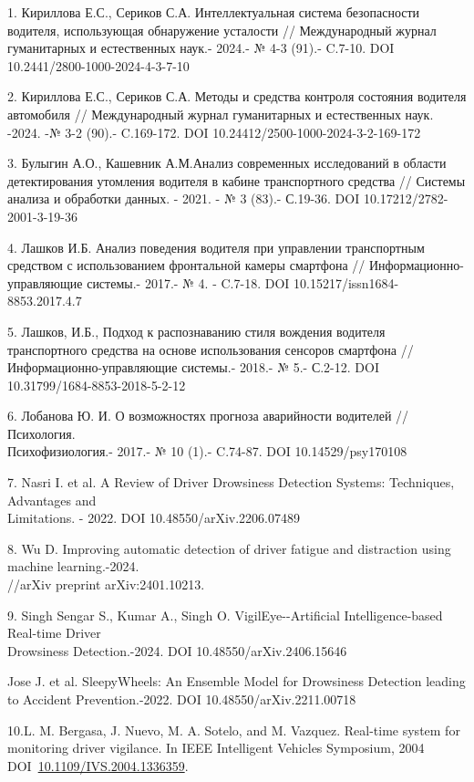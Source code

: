 \begin{references}
1. Кириллова Е.С., Сериков С.А. Интеллектуальная система безопасности
водителя, использующая обнаружение усталости // Международный журнал
гуманитарных и естественных наук.- 2024.- № 4-3 (91).- C.7-10. DOI
10.2441/2800-1000-2024-4-3-7-10

2. Кириллова Е.С., Сериков С.А. Методы и средства контроля состояния
водителя автомобиля // Международный журнал гуманитарных и естественных
наук. -2024. -№ 3-2 (90).- C.169-172. DOI
10.24412/2500-1000-2024-3-2-169-172

3. Булыгин А.О., Кашевник А.М.Анализ современных исследований в области
детектирования утомления водителя в кабине транспортного средства //
Системы анализа и обработки данных. - 2021. - № 3 (83).- С.19-36. DOI
10.17212/2782-2001-3-19-36

4. Лашков И.Б. Анализ поведения водителя при управлении транспортным
средством с использованием фронтальной камеры смартфона //
Информационно-управляющие системы.- 2017.- № 4. - C.7-18. DOI
10.15217/issn1684-8853.2017.4.7

5. Лашков, И.Б., Подход к распознаванию стиля вождения водителя
транспортного средства на основе использования сенсоров смартфона //
Информационно-управляющие системы.- 2018.- № 5.- С.2-12. DOI
10.31799/1684-8853-2018-5-2-12

6. Лобанова Ю. И. О возможностях прогноза аварийности водителей //
Психология. \\Психофизиология.- 2017.- № 10 (1).- C.74-87. DOI
10.14529/psy170108

7. Nasri I. et al. A Review of Driver Drowsiness Detection Systems:
Techniques, Advantages and \\Limitations. - 2022. DOI
10.48550/arXiv.2206.07489

8. Wu D. Improving automatic detection of driver fatigue and distraction
using machine learning.-2024.\\//arXiv preprint arXiv:2401.10213.

9. Singh Sengar S., Kumar A., Singh O. VigilEye-\/-Artificial
Intelligence-based Real-time Driver \\Drowsiness Detection.-2024. DOI
10.48550/arXiv.2406.15646

Jose J. et al. SleepyWheels: An Ensemble Model for Drowsiness Detection
leading to Accident Prevention.-2022. DOI 10.48550/arXiv.2211.00718

10.L. M. Bergasa, J. Nuevo, M. A. Sotelo, and M. Vazquez. Real-time
system for monitoring driver vigilance. In IEEE Intelligent Vehicles
Symposium, 2004
DOI~\href{https://doi.org/10.1109/IVS.2004.1336359}{10.1109/IVS.2004.1336359}.


\end{references}
